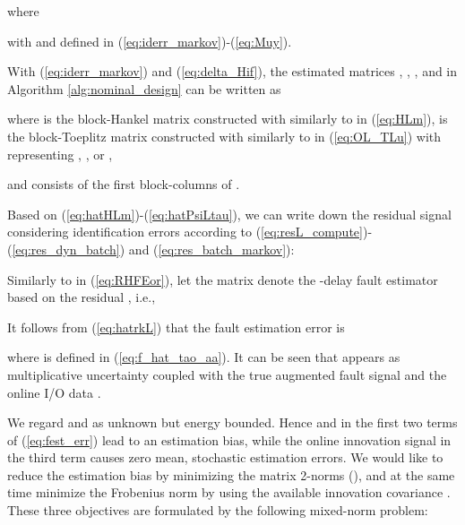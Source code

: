 \documentclass[twocolumn]{autart}
\begin{document}
where

with  and  defined in (\ref{eq:iderr_markov})-(\ref{eq:Muy}).

With (\ref{eq:iderr_markov}) and (\ref{eq:delta_Hif}), the estimated matrices , , ,  and  in Algorithm \ref{alg:nominal_design} can be written as

where  is the block-Hankel matrix constructed with  similarly to  in (\ref{eq:HLm}),  is the block-Toeplitz matrix constructed with  similarly to  in (\ref{eq:OL_TLu}) with  representing , , or ,


and  consists of the first  block-columns of .

Based on (\ref{eq:hatHLm})-(\ref{eq:hatPsiLtau}), we can write down the residual signal  considering identification errors according to (\ref{eq:resL_compute})-(\ref{eq:res_dyn_batch}) and (\ref{eq:res_batch_markov}):


Similarly to  in (\ref{eq:RHFEor}), let the matrix  denote the -delay fault estimator based on the residual , i.e.,

It follows from (\ref{eq:hatrkL}) that the fault estimation error is 

where  is defined in (\ref{eq:f_hat_tao_aa}). It can be seen that  appears as multiplicative uncertainty coupled with the true augmented fault signal  and the online I/O data .

We regard  and  as unknown but energy bounded.
Hence  and  in the first two terms of (\ref{eq:fest_err}) lead to an estimation bias, while the online innovation signal  in the third term causes zero mean, stochastic estimation errors. We would like to reduce the estimation bias by minimizing the matrix 2-norms  (), and at the same time
minimize the Frobenius norm  by using the available innovation covariance . These three objectives are formulated by the following mixed-norm problem:
\end{document}
